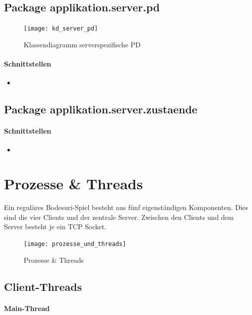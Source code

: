 \documentclass[12pt,halfparskip]{scrartcl}
\begin{document}
	\subsection{Package applikation.server.pd}

		\begin{figure}[H]
			\centering
			\texttt{[image: kd\_server\_pd]}
			\caption{Klassendiagramm serverspezifische PD}
			\label{fig:kd_server_pd}
		\end{figure}


		\paragraph{Schnittstellen}
		\begin{itemize}
			\item 
		\end{itemize}
	
	\subsection{Package applikation.server.zustaende}

		\paragraph{Schnittstellen}
		\begin{itemize}
			\item 
		\end{itemize}	


\clearpage
\section{Prozesse \& Threads}
Ein reguläres Bodesuri-Spiel besteht aus fünf eigenständigen Komponenten. Dies sind die vier Clients und der zentrale Server. Zwischen den Clients und dem Server besteht je ein TCP Socket. 

\begin{figure}[h]
	\centering
	\texttt{[image: prozesse\_und\_threads]}
	\caption{Prozesse \& Threads}
	\label{fig:prozesse_und_threads}
\end{figure}

\clearpage
\subsection{Client-Threads}
\label{ssub:client_threads}

\paragraph{Main-Thread}
\label{ssub:main_thread}
\end{document}
